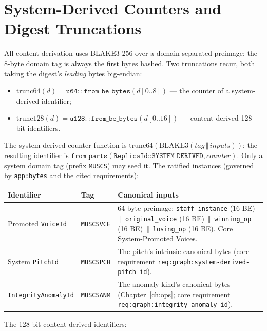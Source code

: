 \documentclass[11pt,letterpaper]{report}
\newcommand{\sectionsc}[1]{{\addfontfeatures{Letters=SmallCaps}#1}}
\newcounter{requirement}[chapter]
\newcommand{\cat}{\ensuremath{\,\Vert\,}}
\begin{document}
\section{System-Derived Counters and Digest Truncations}
\label{sec:ids:derivations}

All content derivation uses BLAKE3-256 over a domain-separated preimage: the
8-byte domain tag is always the first bytes hashed. Two truncations recur,
both taking the digest's \emph{leading} bytes big-endian:

\begin{itemize}
  \item $\mathrm{trunc64}(d) = \mathtt{u64::from\_be\_bytes}(d[0..8])$ ---
    the counter of a system-derived identifier;
  \item $\mathrm{trunc128}(d) = \mathtt{u128::from\_be\_bytes}(d[0..16])$ ---
    content-derived 128-bit identifiers.
\end{itemize}

The system-derived counter function is
$\mathrm{trunc64}(\mathrm{BLAKE3}(\mathit{tag} \cat \mathit{inputs}))$; the
resulting identifier is
$\texttt{from\_parts}(\texttt{ReplicaId::SYSTEM\_DERIVED}, \mathit{counter})$.
Only a system domain tag (prefix \texttt{MUSCS}) may seed it. The ratified
instances (governed by \texttt{app:bytes} and the cited requirements):

\begingroup\small
\begin{longtable}{p{1.35in} p{0.7in} p{3.5in}}
  \toprule
  \textbf{Identifier} & \textbf{Tag} & \textbf{Canonical inputs} \\
  \midrule
  \endhead
  Promoted \texttt{VoiceId} & \texttt{MUSCSVCE} &
    64-byte preimage: \texttt{staff\_instance} (16 BE) \cat{}
    \texttt{original\_voice} (16 BE) \cat{} \texttt{winning\_op} (16 BE)
    \cat{} \texttt{losing\_op} (16 BE). Core \sectionsc{System-Promoted
    Voices}. \\
  System \texttt{PitchId} & \texttt{MUSCSPCH} &
    The pitch's intrinsic canonical bytes (core requirement
    \texttt{req:graph:system-derived-pitch-id}). \\
  \texttt{IntegrityAnomalyId} & \texttt{MUSCSANM} &
    The anomaly kind's canonical bytes (Chapter~\ref{ch:ops}; core
    requirement \texttt{req:graph:integrity-anomaly-id}). \\
  \bottomrule
\end{longtable}
\endgroup

The 128-bit content-derived identifiers:
\end{document}
